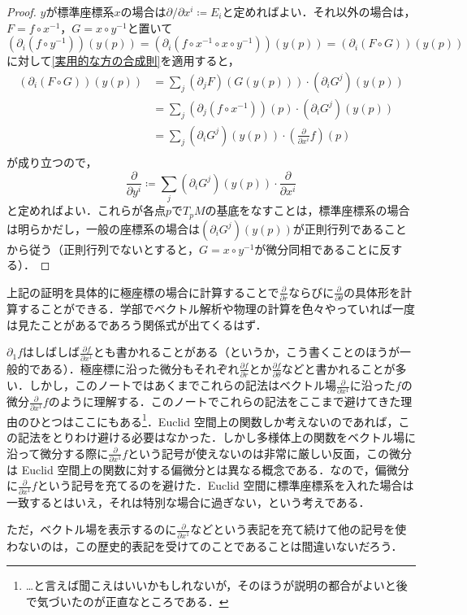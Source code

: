 \begin{proof}
$y$が標準座標系$x$の場合は$\partial / \partial x^i \coloneqq E_i$と定めればよい．それ以外の場合は，$F = f \circ x^{-1}$，$G = x \circ y^{-1}$と置いて$\left(\partial_i (f \circ y^{-1}) \right) (y (p)) = \left(\partial_i (f \circ x^{-1} \circ x \circ y^{-1}) \right) (y (p)) = \left(\partial_i (F \circ G) \right) (y (p))$に対して\cref{実用的な方の合成則}を適用すると，
\begin{align}
\left(\partial_i (F \circ G) \right) (y (p)) &= \sum_{j} (\partial_j F)(G(y(p))) \cdot (\partial_i G^j)(y(p))\\
&= \sum_{j} (\partial_j (f \circ x^{-1}))(p) \cdot (\partial_i G^j)(y(p))\\
&= \sum_{j} (\partial_i G^j)(y(p)) \cdot \left(\frac{\partial}{\partial x^i} f\right)(p)\\
\end{align}が成り立つので，
\begin{equation}
\frac{\partial}{\partial y^i} \coloneqq \sum_{j} (\partial_i G^j)(y(p)) \cdot \frac{\partial}{\partial x^i}
\end{equation}と定めればよい．これらが各点$p$で$T_pM$の基底をなすことは，標準座標系の場合は明らかだし，一般の座標系の場合は$(\partial_i G^j)(y(p))$が正則行列であることから従う（正則行列でないとすると，$G = x \circ y^{-1}$が微分同相であることに反する）．
\end{proof}

\begin{que}
上記の証明を具体的に極座標の場合に計算することで$\frac{\partial}{\partial r}$ならびに$\frac{\partial}{\partial \theta}$の具体形を計算することができる．学部でベクトル解析や物理の計算を色々やっていれば一度は見たことがあるであろう関係式が出てくるはず．
\end{que}

\begin{dig}$\partial_1 f$はしばしば$\frac{\partial f}{\partial x^1}$とも書かれることがある（というか，こう書くことのほうが一般的である）．極座標に沿った微分もそれぞれ$\frac{\partial f}{\partial r}$とか$\frac{\partial f}{\partial \theta}$などと書かれることが多い．しかし，このノートではあくまでこれらの記法はベクトル場$\frac{\partial}{\partial x^1}$に沿った$f$の微分$\frac{\partial}{\partial x^1}f$のように理解する．このノートでこれらの記法をここまで避けてきた理由のひとつはここにもある\footnote{…と言えば聞こえはいいかもしれないが，そのほうが説明の都合がよいと後で気づいたのが正直なところである．}．Euclid 空間上の関数しか考えないのであれば，この記法をとりわけ避ける必要はなかった．しかし多様体上の関数をベクトル場に沿って微分する際に$\frac{\partial}{\partial x^1}f$という記号が使えないのは非常に厳しい反面，この微分は Euclid 空間上の関数に対する偏微分とは異なる概念である．なので，偏微分に$\frac{\partial}{\partial x^1}f$という記号を充てるのを避けた．Euclid 空間に標準座標系を入れた場合は一致するとはいえ，それは特別な場合に過ぎない，という考えである．

ただ，ベクトル場を表示するのに$\frac{\partial}{\partial x^1}$などという表記を充て続けて他の記号を使わないのは，この歴史的表記を受けてのことであることは間違いないだろう．
\end{dig}

